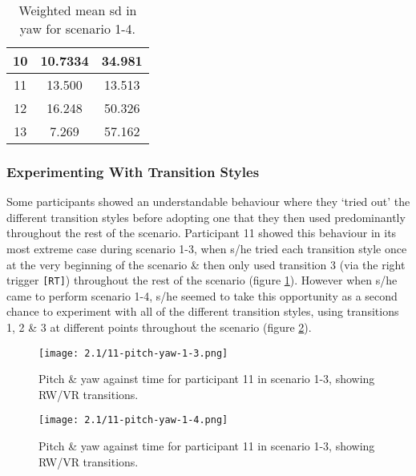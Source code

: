 \begin{table}
\begin{center}
\begin{minipage}[t]{.47\linewidth}
\begin{center}
\begin{tabular}{|c|c|c|}
\hline

10 & 10.7334 & 34.981 \\

\hline

11 & 13.500 & 13.513 \\

\hline

12 & 16.248 & 50.326 \\

\hline

13 & 7.269 & 57.162 \\

\hline
\end{tabular}
\caption{Weighted mean sd in yaw for scenario 1-4.}
\label{mean-sd-yaw-1-4}
\end{center}
\end{minipage}
\end{center}
\end{table}


\subsubsection{Experimenting With Transition Styles}

Some participants showed an understandable behaviour where they `tried out' the different transition styles before adopting one that they then used predominantly throughout the rest of the scenario. Participant 11 showed this behaviour in its most extreme case during scenario 1-3, when s/he tried each transition style once at the very beginning of the scenario \& then only used transition 3 (via the right trigger \texttt{[RT]}) throughout the rest of the scenario (figure \ref{11-pitch-yaw-1-3.png}). However when s/he came to perform scenario 1-4, s/he seemed to take this opportunity as a second chance to experiment with all of the different transition styles, using transitions 1, 2 \& 3 at different points throughout the scenario (figure \ref{11-pitch-yaw-1-4.png}).

\begin{figure}[h]
	\begin{center}
	\texttt{[image: 2.1/11-pitch-yaw-1-3.png]}
	\caption{Pitch \& yaw against time for participant 11 in scenario 1-3, showing RW/VR transitions.}
	\label{11-pitch-yaw-1-3.png}
	\end{center}
\end{figure}

\begin{figure}[h]
	\begin{center}
	\texttt{[image: 2.1/11-pitch-yaw-1-4.png]}
	\caption{Pitch \& yaw against time for participant 11 in scenario 1-3, showing RW/VR transitions.}
	\label{11-pitch-yaw-1-4.png}
	\end{center}
\end{figure}

